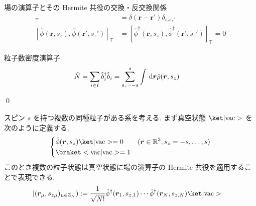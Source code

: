\documentclass[uplatex,dvipdfmx,a4paper,11pt]{jlreq}
\makeatletter
\newcommand{\RR}{\mathbb{R}}
\newcommand{\ZZ}{\mathbb{Z}}
\newcommand{\rr}{\bm{r}}
\numberwithin{equation}{section}
\theoremstyle{definition}
\renewenvironment{proof}[1][\proofname]{\par
  \normalfont
  \topsep6\p@\@plus6\p@ \trivlist
  \item[\hskip\labelsep{\bfseries #1}\@addpunct{\bfseries}]\ignorespaces\quad\par
}{
  \qed\endtrivlist\@endpefalse
}
\renewcommand\proofname{証明}
\makeatother
\begin{document}
\begin{theorem}
  場の演算子とその Hermite 共役の交換・反交換関係
  \begin{align}
    [\hat{\phi}(\rr, s_z), \hat{\phi}^\dagger(\rr', s_z')]_\mp & = \delta(\rr - \rr')\delta_{s_zs_z'}                                     \\
    [\hat{\phi}(\rr, s_z), \hat{\phi}(\rr', s_z')]_\mp         & = [\hat{\phi}^\dagger(\rr, s_z), \hat{\phi}^\dagger(\rr', s_z')]_\mp = 0
  \end{align}
\end{theorem}

\begin{theorem}
  粒子数密度演算子
  \begin{align}
    \hat{N} & = \sum_{i\in I}\hat{b}_i^\dagger\hat{b}_i = \sum_{s_z = -s}^{s}\int\dl{\rr}\hat{\rho}(\rr, s_z)
  \end{align}
\end{theorem}
\begin{proof}

\end{proof}

\begin{definition}[複数の同種粒子の場]
  スピン $s$ を持つ複数の同種粒子がある系を考える.
  まず真空状態 $\ket|\mathrm{vac}>$ を次のように定義する.
  \begin{align}
    \begin{dcases}
      \hat{\phi}(\rr, s_z)\ket|\mathrm{vac}> = 0 & (\rr\in\RR^3, s_z = -s,\ldots,s) \\
      \braket<\mathrm{vac}|\mathrm{vac}> = 1
    \end{dcases}
  \end{align}
  このとき複数の粒子状態は真空状態に場の演算子の Hermite 共役を適用することで表現できる.
  \begin{align}
    |(\rr_\mu, s_{z\mu})_{\mu\in\ZZ_N}) & := \frac{1}{\sqrt{N!}}\hat{\phi}^\dagger(\rr_1, s_{z,1})\cdots\hat{\phi}^\dagger(\rr_N, s_{z,N})\ket|\mathrm{vac}>
  \end{align}
\end{definition}
\end{document}
